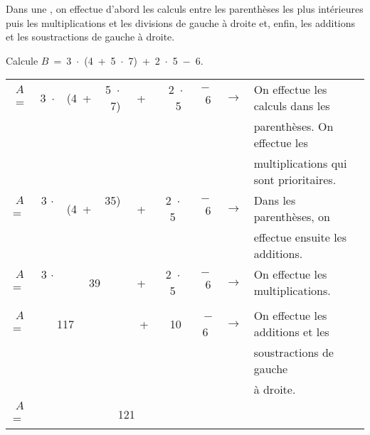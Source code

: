 
\begin{aconnaitre}
Dans une , on effectue d'abord les calculs entre les parenthèses les plus intérieures puis les multiplications et les divisions de gauche à droite et, enfin, les additions et les soustractions de gauche à droite.
\end{aconnaitre}

\begin{methode*1}

\begin{exemple*1}
Calcule $B$ = 3 $\cdot$ (4 + 5 $\cdot$ 7) + 2 $\cdot$ 5 $-$ 6.

\begin{center}
\begin{tabularx}{1.2\linewidth}{ccccccccX}
$A$=	 	& 3 $\cdot$	& (4 +	& 5 $\cdot$ 7)	& + & 2 $\cdot$  5	& $-$ 6	& $\rightarrow$ & On effectue les calculs dans les \\ \cline{4-4}
&&&&&&&&  parenthèses. On effectue les\\
&&&&&&&& multiplications qui sont prioritaires. \\
$A$= 	& 3 $\cdot$  	& (4 + 	&  35)  		&+ & 2 $\cdot$  5 	&$-$ 6  	& $\rightarrow$ & Dans les parenthèses, on \\ \cline{3-4}
 &&&&&&&& effectue ensuite les additions.\\
$A$= 	& 3 $\cdot$  	&    \multicolumn{2}{c}{39}      		     		& + & 2 $\cdot$  5 	&$-$ 6  	& $\rightarrow$ & On effectue les multiplications.\\ \cline{2-3}\cline{6-6}
 &&&&&&&& \\
$A$= 	&      		\multicolumn{2}{c}{117} &             			& +  & 10  			& $-$6  	& $\rightarrow$ & On effectue les additions et les \\ \cline{2-7}
 &&&&&&&& soustractions de gauche\\
 &&&&&&&& à droite.\\
$A$= 	&                \multicolumn{6}{c}{121}                             								&  & \\
\end{tabularx}
\end{center}
\end{exemple*1}




\end{methode*1}
